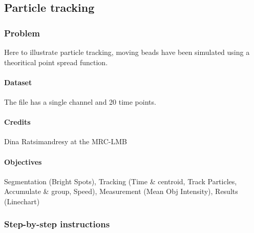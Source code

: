 \subsection{Particle tracking}

\subsubsection*{Problem}
Here to illustrate particle tracking, moving beads have been simulated using a theoritical point spread function.

\paragraph{Dataset} The file  has a single channel and 20 time points.

\paragraph{Credits} Dina Ratsimandresy at the MRC-LMB

\paragraph{Objectives} Segmentation (Bright Spots), Tracking (Time \& centroid, Track Particles, Accumulate \& group, Speed), Measurement (Mean Obj Intensity), Results (Linechart)


\subsubsection*{Step-by-step instructions}

